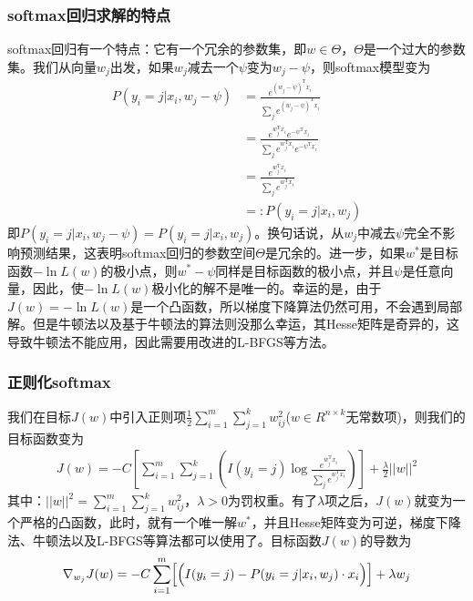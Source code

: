         \subsubsection{softmax回归求解的特点}
            \par
            softmax回归有一个特点：它有一个冗余的参数集，即$w\in \Theta$，$\Theta$是一个过大的参数集。我们从向量$w_j$出发，如果$w_j$减去一个$\psi$变为$w_j-\psi$，则softmax模型变为
            \begin{align*}
            P(y_i = j|x_i,w_j-\psi) &= \frac{e^{(w_j-\psi)^\mathrm{T}x_i}}{\sum_j e^{(w_j-\psi)^\mathrm{T}x_i}}\\
            &= \frac{e^{w_j^\mathrm{T}x_i}e^{-\psi^\mathrm{T}x_i}}{\sum_j e^{w_j^\mathrm{T}x_i}e^{-\psi^\mathrm{T}x_i}} \\
            &=\frac{e^{w_j^\mathrm{T}x_i}}{\sum_j e^{w_j^\mathrm{T}x_i}}\\
            &=:P(y_i = j|x_i,w_j)
            \end{align*}
            即$P(y_i = j|x_i,w_j-\psi) = P(y_i = j|x_i,w_j)$。换句话说，从$w_j$中减去$\psi$完全不影响预测结果，这表明softmax回归的参数空间$\Theta$是冗余的。进一步，如果$w^*$是目标函数$-\ln L(w)$的极小点，则$w^*-\psi$同样是目标函数的极小点，并且$\psi$是任意向量，因此，使$-\ln L(w)$极小化的解不是唯一的。幸运的是，由于$J(w) = -\ln L(w)$是一个凸函数，所以梯度下降算法仍然可用，不会遇到局部解。但是牛顿法以及基于牛顿法的算法则没那么幸运，其Hesse矩阵是奇异的，这导致牛顿法不能应用，因此需要用改进的L-BFGS等方法。
        \subsubsection{正则化softmax}
            \par
            我们在目标$J(w)$中引入正则项$\frac{1}{2}\sum\limits_{i=1}^m\sum\limits_{j=1}^k w_{ij}^2 $($w\in R^{n\times k}$无常数项)，则我们的目标函数变为
            \begin{align*}
            J(w) = -C\left[ \sum_{i=1}^m\sum_{j=1}^k \left( I(y_i=j) \log \frac{e^{w_j^\mathrm{T}x_i}}{\sum_je^{w_j^\mathrm{T}x_i}} \right)  \right] + \frac{\lambda}{2}||w||^2
            \end{align*}
            其中：$||w||^2 = \sum\limits_{i=1}^m\sum\limits_{j=1}^k w_{ij}^2 $，$\lambda>0$为罚权重。有了$\lambda$项之后，$J(w)$就变为一个严格的凸函数，此时，就有一个唯一解$w^*$，并且Hesse矩阵变为可逆，梯度下降法、牛顿法以及L-BFGS等算法都可以使用了。目标函数$J(w)$的导数为
            \begin{align*}
            \nabla_{w_j} J(w) = -C\sum_{i=1}^m \Bigl[\Bigl(I(y_i=j) - P(y_i=j|x_i,w_j) \cdot x_i\Bigr)\Bigr] + \lambda w_j
            \end{align*}

